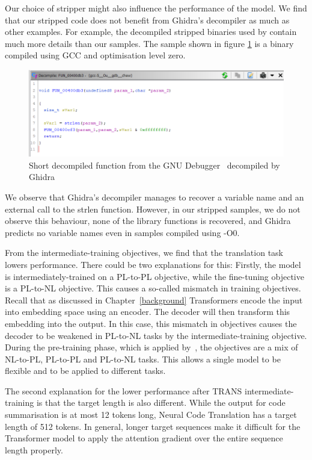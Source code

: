 Our choice of stripper might also influence the performance of the model. We find that our stripped code does not benefit from Ghidra's decompiler as much as other examples. For example, the decompiled stripped binaries used by \citeauthor{Nero} contain much more details than our samples. The sample shown in figure \ref{fig:Nero} is a binary compiled using GCC and optimisation level zero.

\begin{figure}[tbh]
  \centering
  \includegraphics[width=\linewidth]{img/Nero.png}
  \caption{Short decompiled function from the GNU Debugger~\cite{Nero} decompiled by Ghidra}
  \label{fig:Nero}
\end{figure}

We observe that Ghidra's decompiler manages to recover a variable name and an external call to the strlen function. However, in our stripped samples, we do not observe this behaviour, none of the library functions is recovered, and Ghidra predicts no variable names even in samples compiled using -O0.

From the intermediate-training objectives, we find that the translation task lowers performance. There could be two explanations for this: Firstly, the model is intermediately-trained on a PL-to-PL objective, while the fine-tuning objective is a PL-to-NL objective. This causes a so-called mismatch in training objectives. Recall that as discussed in Chapter~\ref{background} Transformers encode the input into embedding space using an encoder. The decoder will then transform this embedding into the output. In this case, this mismatch in objectives causes the decoder to be weakened in PL-to-NL tasks by the intermediate-training objective. During the pre-training phase, which is applied by~\citeauthor{CodeT5}, the objectives are a mix of NL-to-PL, PL-to-PL and PL-to-NL tasks. This allows a single model to be flexible and to be applied to different tasks.

The second explanation for the lower performance after TRANS intermediate-training is that the target length is also different. While the output for code summarisation is at most 12 tokens long, Neural Code Translation has a target length of 512 tokens. In general, longer target sequences make it difficult for the Transformer model to apply the attention gradient over the entire sequence length properly.

